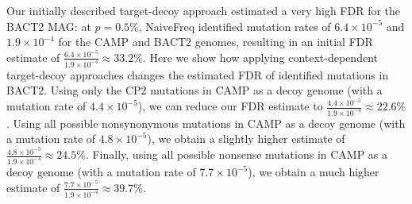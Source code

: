 Our initially described target-decoy approach estimated a very high FDR for the BACT2 MAG:
at $p = 0.5\%$, NaiveFreq identified mutation rates of $6.4 \times 10^{-5}$ and $1.9 \times 10^{-4}$ for the CAMP and BACT2 genomes, resulting in an initial FDR estimate of $\frac{6.4 \times 10^{-5}}{1.9 \times 10^{-4}} \approx 33.2\%$.
%
Here we show how applying context-dependent target-decoy approaches changes the estimated FDR of identified mutations in BACT2.
%
Using only the CP2 mutations in CAMP as a decoy genome (with a mutation rate of $4.4 \times 10^{-5}$), we can reduce our FDR estimate to $\frac{4.4 \times 10^{-5}}{1.9 \times 10^{-4}} \approx 22.6\%$.
%
Using all possible nonsynonymous mutations in CAMP as a decoy genome (with a mutation rate of $4.8 \times 10^{-5}$), we obtain a slightly higher estimate of $\frac{4.8 \times 10^{-5}}{1.9 \times 10^{-4}} \approx 24.5\%$.
%
Finally, using all possible nonsense mutations in CAMP as a decoy genome (with a mutation rate of $7.7 \times 10^{-5}$), we obtain a much higher estimate of $\frac{7.7 \times 10^{-5}}{1.9 \times 10^{-4}} \approx 39.7\%$.
\endinput